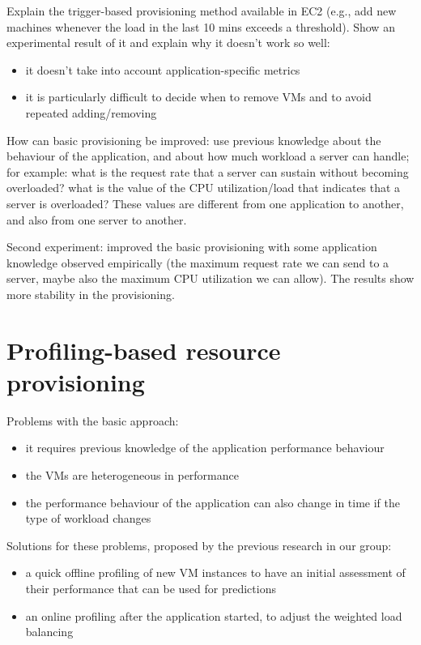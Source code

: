 
Explain the trigger-based provisioning method available in EC2 (e.g., add new machines
whenever the load in the last 10 mins exceeds a threshold). Show an experimental result
of it and explain why it doesn't work so well:

\begin{itemize}
\item it doesn't take into account application-specific metrics
\item it is particularly difficult to decide when to remove VMs and to avoid
repeated adding/removing
\end{itemize}

How can basic provisioning be improved: use previous knowledge about the behaviour
of the application, and about how much workload a server can handle; for example:
what is the request rate that a server can sustain without becoming overloaded?
what is the value of the CPU utilization/load that indicates that a server is
overloaded? These values are different from one application to another, and also
from one server to another. 

Second experiment: improved the basic provisioning with some application knowledge
observed empirically (the maximum request rate we can send to a server, maybe also
the maximum CPU utilization we can allow). The results show more stability in the
provisioning.  


\section*{Profiling-based resource provisioning}


Problems with the basic approach:
\begin{itemize}
\item it requires previous knowledge of the application performance behaviour
\item the VMs are heterogeneous in performance
\item the performance behaviour of the application can also change in time
if the type of workload changes
\end{itemize}

Solutions for these problems, proposed by the previous research in our group:
\begin{itemize}
\item a quick offline profiling of new VM instances to have an initial assessment
of their performance that can be used for predictions
\item an online profiling after the application started, to adjust the weighted
load balancing
\end{itemize}


